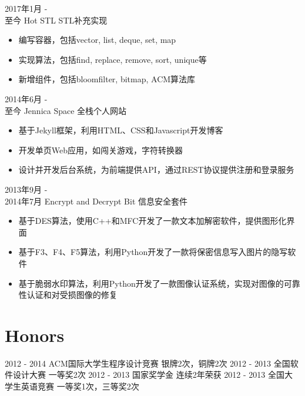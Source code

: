\documentclass[letterpaper]{twentysecondcv} %
\begin{document}
\begin{twenty} %
	\twentyitem
	{2017年1月 - \\至今}
	{Hot STL}
	{STL补充实现}
	{}
	{
		{\begin{itemize}
				\item 编写容器，包括vector, list, deque, set, map
				\item 实现算法，包括find, replace, remove, sort, unique等
				\item 新增组件，包括bloomfilter, bitmap, ACM算法库
		\end{itemize}}
	}
	
	\twentyitem
	{2014年6月 - \\至今}
	{Jennica Space}
	{全栈个人网站}
	{}
	{
		{\begin{itemize}
				\item 基于Jekyll框架，利用HTML、CSS和Javascript开发博客
				\item 开发单页Web应用，如闯关游戏，字符转换器
				\item 设计并开发后台系统，为前端提供API，通过REST协议提供注册和登录服务
		\end{itemize}}
	}
	
	\twentyitem
	{2013年9月 - \\2014年7月}
	{Encrypt and Decrypt Bit}
	{信息安全套件}
	{}
	{
		{\begin{itemize}
				\item 基于DES算法，使用C++和MFC开发了一款文本加解密软件，提供图形化界面
				\item 基于F3、F4、F5算法，利用Python开发了一款将保密信息写入图片的隐写软件
				\item 基于脆弱水印算法，利用Python开发了一款图像认证系统，实现对图像的可靠性认证和对受损图像的修复
		\end{itemize}}
	}
	
\end{twenty}


\section{Honors}
\begin{twenty}
	\twentyitemthree
	{2012 - 2014}
	{ACM国际大学生程序设计竞赛}
	{银牌2次，铜牌2次}
	\twentyitemthree
	{2012 - 2013}
	{全国软件设计大赛}
	{一等奖2次}
	\twentyitemthree
	{2012 - 2013}
	{国家奖学金}
	{连续2年荣获}
	\twentyitemthree
	{2012 - 2013}
	{全国大学生英语竞赛}
	{一等奖1次，三等奖2次}
\end{twenty}
\end{document}
